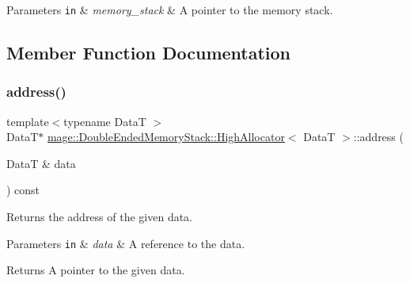 \begin{DoxyParams}[1]{Parameters}
\mbox{\tt in}  & {\em memory\+\_\+stack} & A pointer to the memory stack. \\
\hline
\end{DoxyParams}


\subsection{Member Function Documentation}
\hypertarget{structmage_1_1_double_ended_memory_stack_1_1_high_allocator_a5d2532bb8ebb4919271a312e3a872579}{}\label{structmage_1_1_double_ended_memory_stack_1_1_high_allocator_a5d2532bb8ebb4919271a312e3a872579} 
\subsubsection{\texorpdfstring{address()}{address()}\hspace{0.1cm}{\footnotesize\ttfamily [1/2]}}
{\footnotesize\ttfamily template$<$typename DataT $>$ \\
DataT$\ast$ \hyperlink{structmage_1_1_double_ended_memory_stack_1_1_high_allocator}{mage\+::\+Double\+Ended\+Memory\+Stack\+::\+High\+Allocator}$<$ DataT $>$\+::address (\begin{DoxyParamCaption}\item[{DataT \&}]{data }\end{DoxyParamCaption}) const\hspace{0.3cm}{\ttfamily [noexcept]}}

Returns the address of the given data.


\begin{DoxyParams}[1]{Parameters}
\mbox{\tt in}  & {\em data} & A reference to the data. \\
\hline
\end{DoxyParams}
\begin{DoxyReturn}{Returns}
A pointer to the given data. 
\end{DoxyReturn}
\hypertarget{structmage_1_1_double_ended_memory_stack_1_1_high_allocator_ab88c9b0e885ee1cc1aaaad2194ae7910}{}\label{structmage_1_1_double_ended_memory_stack_1_1_high_allocator_ab88c9b0e885ee1cc1aaaad2194ae7910} 
